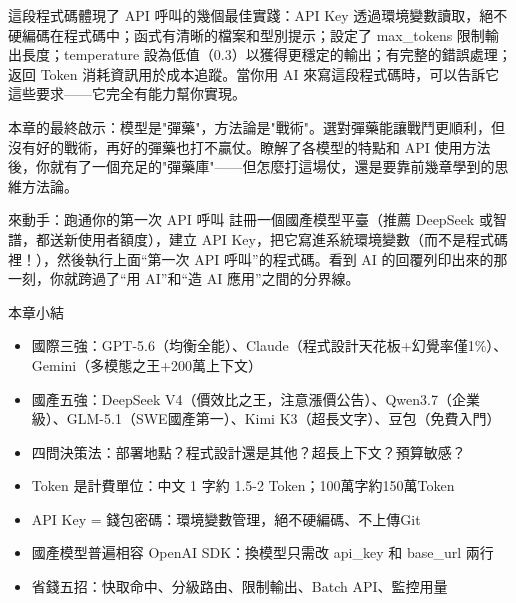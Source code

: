 這段程式碼體現了 API 呼叫的幾個最佳實踐：API Key 透過環境變數讀取，絕不硬編碼在程式碼中；函式有清晰的檔案和型別提示；設定了 max\_tokens 限制輸出長度；temperature 設為低值（0.3）以獲得更穩定的輸出；有完整的錯誤處理；返回 Token 消耗資訊用於成本追蹤。當你用 AI 來寫這段程式碼時，可以告訴它這些要求——它完全有能力幫你實現。

本章的最終啟示：模型是"彈藥"，方法論是"戰術"。選對彈藥能讓戰鬥更順利，但沒有好的戰術，再好的彈藥也打不贏仗。瞭解了各模型的特點和 API 使用方法後，你就有了一個充足的"彈藥庫"——但怎麼打這場仗，還是要靠前幾章學到的思維方法論。

\begin{tcbpractice}{來動手：跑通你的第一次 API 呼叫}
註冊一個國產模型平臺（推薦 DeepSeek 或智譜，都送新使用者額度），建立 API Key，把它寫進系統環境變數（而不是程式碼裡！），然後執行上面“第一次 API 呼叫”的程式碼。看到 AI 的回覆列印出來的那一刻，你就跨過了“用 AI”和“造 AI 應用”之間的分界線。

\end{tcbpractice}

\begin{tcbsummary}{本章小結}
\begin{itemize}
  \item 國際三強：GPT-5.6（均衡全能）、Claude（程式設計天花板+幻覺率僅1\%）、Gemini（多模態之王+200萬上下文）
  \item 國產五強：DeepSeek V4（價效比之王，注意漲價公告）、Qwen3.7（企業級）、GLM-5.1（SWE國產第一）、Kimi K3（超長文字）、豆包（免費入門）
  \item 四問決策法：部署地點？程式設計還是其他？超長上下文？預算敏感？
  \item Token 是計費單位：中文 1 字約 1.5-2 Token；100萬字約150萬Token
  \item API Key = 錢包密碼：環境變數管理，絕不硬編碼、不上傳Git
  \item 國產模型普遍相容 OpenAI SDK：換模型只需改 api\_key 和 base\_url 兩行
  \item 省錢五招：快取命中、分級路由、限制輸出、Batch API、監控用量
\end{itemize}

\end{tcbsummary}
